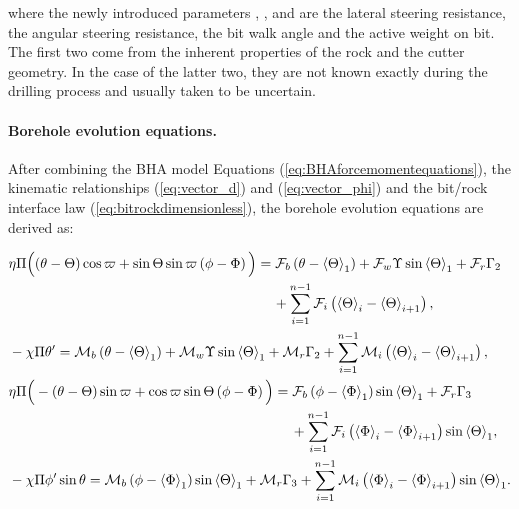 where the newly introduced parameters , ,  and  are the lateral steering resistance, the angular steering resistance, the bit walk angle and the active weight on bit. The first two come from the inherent properties of the rock and the cutter geometry. In the case of the latter two, they are not known exactly during the drilling process and usually taken to be uncertain.

\paragraph{Borehole evolution equations.} After combining the BHA model Equations (\ref{eq:BHAforcemomentequations}), the kinematic relationships (\ref{eq:vector_d}) and (\ref{eq:vector_phi}) and the bit/rock interface law (\ref{eq:bitrockdimensionless}), the borehole evolution equations are derived as:


	\begin{align}
	&\eta \Pi \Big((\theta-\Theta) \cos{\varpi}+\sin \Theta\sin{\varpi} \left( {\phi  - \Phi } \right)\Big)=\mathcal{F}_b\left( {\theta  - {{\rm{\langle\Theta\rangle }}_1}} \right)+{\mathcal{F}_w}\Upsilon \sin{{\rm{\langle\Theta\rangle }}_1}+{\mathcal{F}_r}{\Gamma _2} \nonumber
	\\
	&\kern6.65cm+ \mathop \sum \limits_{i = 1}^{n - 1} {\mathcal{F}_i}\left( {{{\rm{\langle\Theta\rangle }}_i} - {{\rm{\langle\Theta\rangle }}_{i + 1}}} \right), \label{eq:inc_con}
	\\
	&- \chi \Pi \theta {\rm{'}} = \mathcal{M}_b\left( {\theta  - {{\rm{\langle\Theta\rangle }}_1}} \right) + {\mathcal{M}_w}\Upsilon \sin {{\rm{\langle\Theta\rangle }}_1} + {\mathcal{M}_r}{\Gamma _2} + \mathop \sum \limits_{i = 1}^{n - 1} {\mathcal{M}_i}\left( {{{\rm{\langle\Theta\rangle }}_i} - {{\rm{\langle\Theta\rangle }}_{i + 1}}} \right), \label{eq:inc_dde}
	\\ \nonumber
	&\eta \Pi \Big(-(\theta-\Theta) \sin{\varpi}+\cos{\varpi}\sin \Theta \left( {\phi  - \Phi } \right)\Big)= \mathcal{F}_b\left( {\phi  - {{\rm{\langle\Phi\rangle }}_1}} \right)\sin {{\rm{\langle\Theta\rangle }}_1} + {\mathcal{F}_r}{\Gamma _3} \nonumber
	\\
	&\kern7.1cm+ \mathop \sum \limits_{i = 1}^{n - 1} {\mathcal{F}_i}\left( {{{\rm{\langle\Phi\rangle }}_i} - {{\rm{\langle\Phi\rangle }}_{i + 1}}} \right)\sin {{\rm{\langle\Theta\rangle }}_1}, \label{eq:azi_con}
	\\
	&- \chi \Pi \phi '\sin \theta  = \mathcal{M}_b\left( {\phi  - {{\rm{\langle\Phi\rangle }}_1}} \right)\sin {{\rm{\langle\Theta\rangle }}_1} + {\mathcal{M}_r}{\Gamma _3} + \mathop \sum \limits_{i = 1}^{n - 1} {\mathcal{M}_i}\left( {{{\rm{\langle\Phi\rangle }}_i} - {{\rm{\langle\Phi\rangle }}_{i + 1}}} \right)\sin {{\rm{\langle\Theta\rangle }}_1}. \label{eq:azi_dde}
	\end{align}

